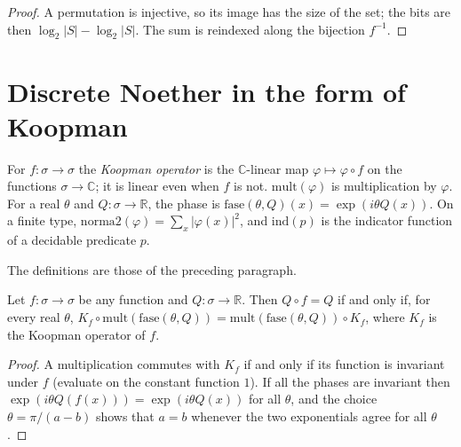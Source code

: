 \begin{proof}
  \leanok
  A permutation is injective, so its image has the size of the set; the bits are then
  $\log_2 |S| - \log_2 |S|$. The sum is reindexed along the bijection $f^{-1}$.
\end{proof}

\section{Discrete Noether in the form of Koopman}
\label{sec:dynamics-koopman}

For $f : \sigma \to \sigma$ the \emph{Koopman operator} is the $\mathbb{C}$-linear map
$\varphi \mapsto \varphi \circ f$ on the functions $\sigma \to \mathbb{C}$; it is linear even when
$f$ is not. $\mathrm{mult}(\varphi)$ is multiplication by $\varphi$. For a real $\theta$ and
$Q : \sigma \to \mathbb{R}$, the phase is $\mathrm{fase}(\theta, Q)(x) = \exp(i \theta Q(x))$. On a
finite type, $\mathrm{norma2}(\varphi) = \sum_x |\varphi(x)|^{2}$, and $\mathrm{ind}(p)$ is the
indicator function of a decidable predicate $p$.

\begin{definition}
  \label{def:dynamics-koopman}
  \leanok
  The definitions are those of the preceding paragraph.
  \own{}
\end{definition}

\begin{theorem}
  \label{thm:dynamics-koopman-noether}
  \leanok
  Let $f : \sigma \to \sigma$ be any function and $Q : \sigma \to \mathbb{R}$. Then $Q \circ f = Q$
  if and only if, for every real $\theta$,
  $K_f \circ \mathrm{mult}(\mathrm{fase}(\theta, Q)) = \mathrm{mult}(\mathrm{fase}(\theta, Q)) \circ K_f$,
  where $K_f$ is the Koopman operator of $f$.
  \own{}
\end{theorem}

\begin{proof}
  \leanok
  A multiplication commutes with $K_f$ if and only if its function is invariant under $f$
  (evaluate on the constant function $1$). If all the phases are invariant then
  $\exp(i\theta Q(f(x))) = \exp(i\theta Q(x))$ for all $\theta$, and the choice
  $\theta = \pi/(a-b)$ shows that $a = b$ whenever the two exponentials agree for all $\theta$.
\end{proof}

